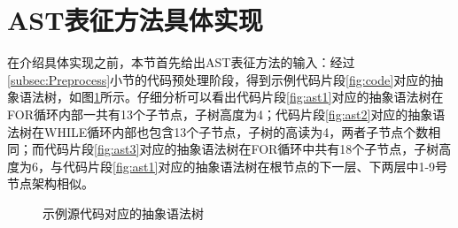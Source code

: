 \section{AST表征方法具体实现}
\label{sec:ASTachieve}
在介绍具体实现之前，本节首先给出AST表征方法的输入：经过\ref{subsec:Preprocess}小节的代码预处理阶段，得到示例代码片段\ref{fig:code}对应的抽象语法树，如图\ref{fig:astcode}所示。仔细分析可以看出代码片段\ref{fig:ast1}对应的抽象语法树在FOR循环内部一共有13个子节点，子树高度为4；代码片段\ref{fig:ast2}对应的抽象语法树在WHILE循环内部也包含13个子节点，子树的高读为4，两者子节点个数相同；而代码片段\ref{fig:ast3}对应的抽象语法树在FOR循环中共有18个子节点，子树高度为6，与代码片段\ref{fig:ast1}对应的抽象语法树在根节点的下一层、下两层中1-9号节点架构相似。
\begin{figure}[htbp]
  \centering  %
  \caption{示例源代码对应的抽象语法树}    %
  \label{fig:astcode}    %
\end{figure}

